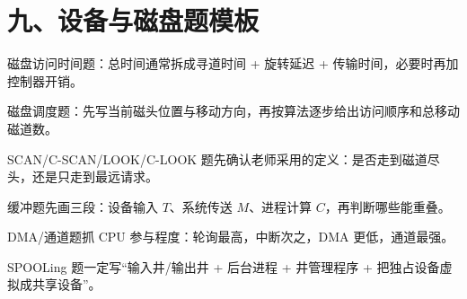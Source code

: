 \section*{九、设备与磁盘题模板}
{}
\begin{points}
  \item 磁盘访问时间题：总时间通常拆成寻道时间 + 旋转延迟 + 传输时间，必要时再加控制器开销。
  \item 磁盘调度题：先写当前磁头位置与移动方向，再按算法逐步给出访问顺序和总移动磁道数。
  \item SCAN/C-SCAN/LOOK/C-LOOK 题先确认老师采用的定义：是否走到磁道尽头，还是只走到最远请求。
  \item 缓冲题先画三段：设备输入 $T$、系统传送 $M$、进程计算 $C$，再判断哪些能重叠。
  \item DMA/通道题抓 CPU 参与程度：轮询最高，中断次之，DMA 更低，通道最强。
  \item SPOOLing 题一定写“输入井/输出井 + 后台进程 + 井管理程序 + 把独占设备虚拟成共享设备”。
\end{points}

